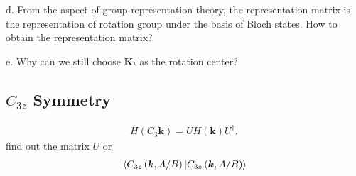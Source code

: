 \documentclass[10pt, oneside]{article}
\newcommand{\p}[1]{\left(#1\right)}
\begin{document}
d. From the aspect of group representation theory, the representation matrix is the representation of rotation group under the basis of Bloch states. How to obtain the representation matrix?

e. Why can we still choose \(\bm{K}_{t}\) as the rotation center?


\subsection{\(C_{3z} \) Symmetry}

\begin{align}
	H \p{C_{3} \bm{k}} = U H \p{\bm{k}} U^{\dagger},
\end{align}
find out the matrix \(U\) or 
\begin{align} 
	\braket{C_{3z} \p{\bm{k}, A/B} | C_{3z}  \p{\bm{k}, A/B}}
\end{align}
\end{document}
